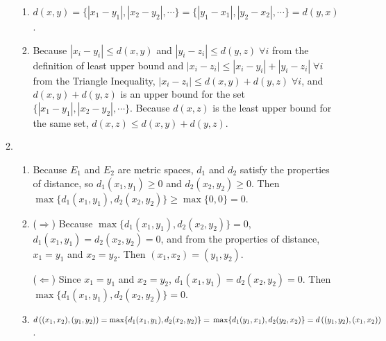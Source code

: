 \documentclass[a4paper,12pt]{article}
\begin{document}
\begin{enumerate}
\begin{enumerate}
\begin{enumerate}[label=(\roman*)]
                        \item
                            $d(x, y) = \{ |x_1 - y_1|, |x_2 - y_2|, \cdots \} = \{ |y_1 - x_1|, |y_2 - x_2|, \cdots \} = d(y, x)$.

                        \item
                            Because $|x_i - y_i| \leq d(x, y)$ and $|y_i - z_i| \leq d(y, z) \; \forall i$ from the definition of least upper bound and $|x_i - z_i| \leq |x_i - y_i| + |y_i - z_i| \; \forall i$ from the Triangle Inequality, $|x_i - z_i| \leq d(x, y) + d(y, z) \; \forall i$, and $d(x, y) + d(y, z)$ is an upper bound for the set $\{ |x_1 - y_1|, |x_2 - y_2|, \cdots \}$. Because $d(x, z)$ is the least upper bound for the same set, $d(x, z) \leq d(x, y) + d(y, z)$.
                    \end{enumerate}

                \item
                    \begin{enumerate}[label=(\roman*)]
                        \item
                            Because $E_1$ and $E_2$ are metric spaces, $d_1$ and $d_2$ satisfy the properties of distance, so $d_1(x_1, y_1) \geq 0$ and $d_2(x_2, y_2) \geq 0$. Then \\
                            $\max\{ d_1(x_1, y_1), d_2(x_2, y_2) \} \geq \max\{0, 0\} = 0$.

                        \item
                            ($\Rightarrow$) Because $\max\{ d_1(x_1, y_1), d_2(x_2, y_2) \} = 0$, $d_1(x_1, y_1) = d_2(x_2, y_2) = 0$, and from the properties of distance, $x_1 = y_1$ and $x_2 = y_2$. Then $(x_1, x_2) = (y_1, y_2)$. \par
                            ($\Leftarrow$) Since $x_1 = y_1$ and $x_2 = y_2$, $d_1(x_1, y_1) = d_2(x_2, y_2) = 0$. Then $\max\{ d_1(x_1, y_1), d_2(x_2, y_2) \} = 0$.

                        \item
                            $d\left( (x_1, x_2), (y_1, y_2) \right) = \max\{ d_1(x_1, y_1), d_2(x_2, y_2) \} = \\
                            \max\{ d_1(y_1, x_1), d_2(y_2, x_2) \} = d\left( (y_1, y_2), (x_1, x_2) \right)$.


\end{enumerate}
\end{enumerate}
\end{enumerate}
\end{document}
